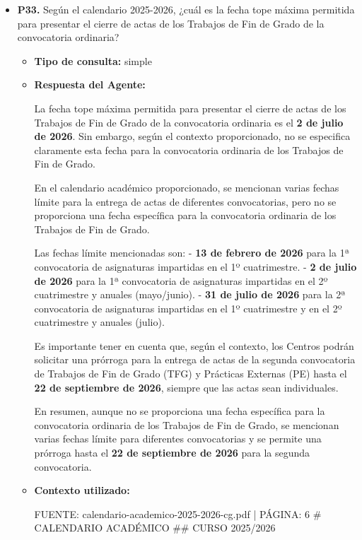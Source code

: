 \documentclass{article}
\begin{document}
\begin{itemize}
\begin{itemize}
\begin{scriptsize}
                  00319829
                \end{scriptsize}
        \end{itemize}


  \item \textbf{P33.} Según el calendario 2025-2026, ¿cuál es la fecha tope máxima permitida para presentar el cierre de actas de los Trabajos de Fin de Grado de la convocatoria ordinaria? \\
        \begin{itemize}
          \item \textbf{Tipo de consulta:} simple
          \item \textbf{Respuesta del Agente:}

                La fecha tope máxima permitida para presentar el cierre de actas de los Trabajos de Fin de Grado de la convocatoria ordinaria es el \textbf{2 de julio de 2026}. Sin embargo, según el contexto proporcionado, no se especifica claramente esta fecha para la convocatoria ordinaria de los Trabajos de Fin de Grado.

                En el calendario académico proporcionado, se mencionan varias fechas límite para la entrega de actas de diferentes convocatorias, pero no se proporciona una fecha específica para la convocatoria ordinaria de los Trabajos de Fin de Grado.

                Las fechas límite mencionadas son:
                - \textbf{13 de febrero de 2026} para la 1ª convocatoria de asignaturas impartidas en el 1º cuatrimestre.
                - \textbf{2 de julio de 2026} para la 1ª convocatoria de asignaturas impartidas en el 2º cuatrimestre y anuales (mayo/junio).
                - \textbf{31 de julio de 2026} para la 2ª convocatoria de asignaturas impartidas en el 1º cuatrimestre y en el 2º cuatrimestre y anuales (julio).

                Es importante tener en cuenta que, según el contexto, los Centros podrán solicitar una prórroga para la entrega de actas de la segunda convocatoria de Trabajos de Fin de Grado (TFG) y Prácticas Externas (PE) hasta el \textbf{22 de septiembre de 2026}, siempre que las actas sean individuales.

                En resumen, aunque no se proporciona una fecha específica para la convocatoria ordinaria de los Trabajos de Fin de Grado, se mencionan varias fechas límite para diferentes convocatorias y se permite una prórroga hasta el \textbf{22 de septiembre de 2026} para la segunda convocatoria.
          \item \textbf{Contexto utilizado:}
                \begin{scriptsize}
                  FUENTE: calendario-academico-2025-2026-cg.pdf | PÁGINA: 6
                  \# CALENDARIO ACADÉMICO
                  \#\# CURSO 2025/2026


\end{scriptsize}
\end{itemize}
\end{itemize}
\end{document}
